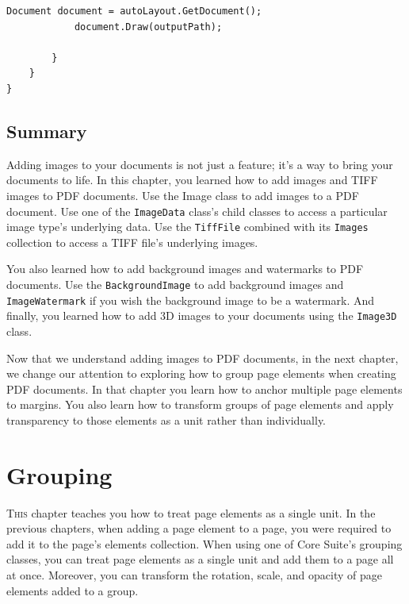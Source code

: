 \documentclass[american,letterpaper]{tufte-book}
\numberwithin{equation}{section}
\numberwithin{figure}{section}
\def\color#1{}%
\begin{document}
{\begin{lstlisting}[caption={Using AutoLayout to create a PDF document.},label={lis:autolayout-images},basicstyle={\small\ttfamily},breaklines=true]
            Document document = autoLayout.GetDocument();
            document.Draw(outputPath);

        }
    }
}
\end{lstlisting}
\leavevmode\egroup

\section{Summary}

Adding images to your documents is not just a feature; it's a way
to bring your documents to life. In this chapter, you learned how
to add images and TIFF images to PDF documents. Use the Image class
to add images to a PDF document. Use one of the \texttt{ImageData}
class's child classes to access a particular image type's underlying
data. Use the \texttt{TiffFile} combined with its \texttt{Images}
collection to access a TIFF file's underlying images. 

You also learned how to add background images and watermarks to PDF
documents. Use the \texttt{BackgroundImage} to add background images
and \texttt{ImageWatermark} if you wish the background image to be
a watermark. And finally, you learned how to add 3D images to your
documents using the \texttt{Image3D} class. 

Now that we understand adding images to PDF documents, in the next
chapter, we change our attention to exploring how to group page elements
when creating PDF documents. In that chapter you learn how to anchor
multiple page elements to margins. You also learn how to transform
groups of page elements and apply transparency to those elements as
a unit rather than individually.

\color{white}
\chapter{Grouping}\label{chap:Page-Elements--grouping}
\color{black}
\BgThispage
\vspace{8.00em}
\lettrine[lines=2,lhang=0.1]{T}{his} chapter teaches you how to treat page elements as a single unit.
In the previous chapters, when adding a page element to a page, you
were required to add it to the page's elements collection. When using
one of Core Suite's grouping classes, you can treat page elements
as a single unit and add them to a page all at once. Moreover, you
can transform the rotation, scale, and opacity of page elements added
to a group. 

}
\end{document}
